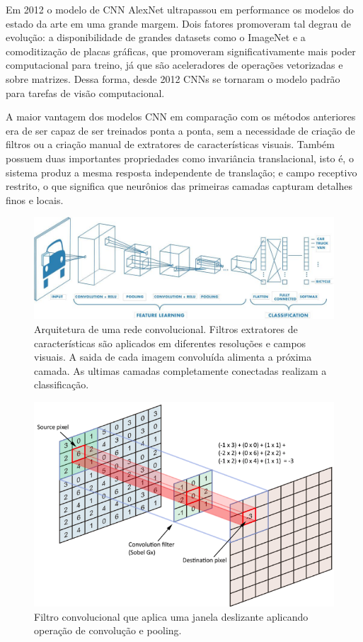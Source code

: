 Em 2012 o modelo de CNN AlexNet ultrapassou em performance os modelos do estado da arte em uma grande margem. Dois fatores promoveram tal degrau de evolução: a disponibilidade de grandes datasets como o ImageNet e a comoditização de placas gráficas, que promoveram significativamente mais poder computacional para treino, já que são aceleradores de operações vetorizadas e sobre matrizes. Dessa forma, desde 2012 CNNs se tornaram o modelo padrão para tarefas de visão computacional.

A maior vantagem dos modelos CNN em comparação com os métodos anteriores era de ser capaz de ser treinados ponta a ponta, sem a necessidade de criação de filtros ou a criação manual de extratores de características visuais. Também possuem duas importantes propriedades como invariância translacional, isto é, o sistema produz a mesma resposta independente de translação; e campo receptivo restrito, o que significa que neurônios das primeiras camadas capturam detalhes finos e locais.
\begin{figure}[!ht]
    \centering
    \includegraphics[width=0.95\columnwidth]{
        Imagens/CNN_mathworks.jpg
    }
    \caption{Arquitetura de uma rede convolucional. Filtros extratores de características são aplicados em diferentes resoluções e campos visuais. A saida de cada imagem convoluída alimenta a próxima camada. As ultimas camadas completamente conectadas realizam a classificação.}
    \label{fig:cnn}
\end{figure}

\begin{figure}[!ht]
    \centering
    \includegraphics[width=0.6\columnwidth]{
        Imagens/operacao_conv.png
    }
    \caption{
 Filtro convolucional que aplica uma janela deslizante aplicando operação de convolução e pooling.  
    }
    \label{fig:conv}
\end{figure}






